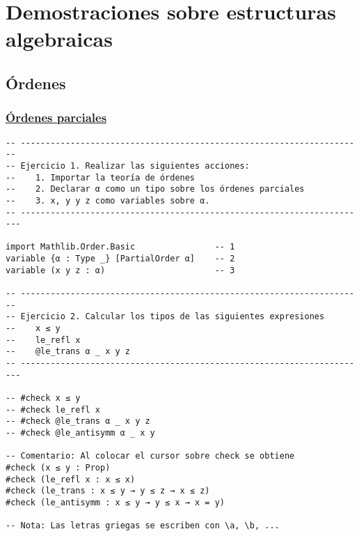 \section{Demostraciones sobre estructuras algebraicas}
\label{sec:orge422298}

\subsection{Órdenes}
\label{sec:org33b1334}

\subsubsection{\href{./src/Basicos/Ordenes\_parciales.lean}{Órdenes parciales}}
\label{sec:org051d57a}
\begin{verbatim}
-- ---------------------------------------------------------------------
-- Ejercicio 1. Realizar las siguientes acciones:
--    1. Importar la teoría de órdenes
--    2. Declarar α como un tipo sobre los órdenes parciales
--    3. x, y y z como variables sobre α.
-- ----------------------------------------------------------------------

import Mathlib.Order.Basic                -- 1
variable {α : Type _} [PartialOrder α]    -- 2
variable (x y z : α)                      -- 3

-- ---------------------------------------------------------------------
-- Ejercicio 2. Calcular los tipos de las siguientes expresiones
--    x ≤ y
--    le_refl x
--    @le_trans α _ x y z
-- ----------------------------------------------------------------------

-- #check x ≤ y
-- #check le_refl x
-- #check @le_trans α _ x y z
-- #check @le_antisymm α _ x y

-- Comentario: Al colocar el cursor sobre check se obtiene
#check (x ≤ y : Prop)
#check (le_refl x : x ≤ x)
#check (le_trans : x ≤ y → y ≤ z → x ≤ z)
#check (le_antisymm : x ≤ y → y ≤ x → x = y)

-- Nota: Las letras griegas se escriben con \a, \b, ...
\end{verbatim}

